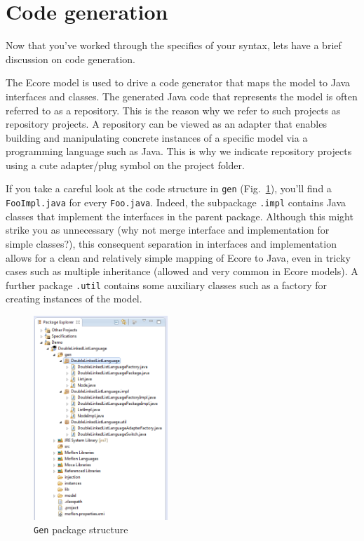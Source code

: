 \newpage
\genHeader
\hypertarget{codeGen common}{} 
\section{Code generation}

Now that you've worked through the specifics of your syntax, lets have a brief discussion on code generation.

The Ecore model is used to drive a code generator that maps the model to Java interfaces and classes. The generated Java code that represents the model is often
referred to as a repository. This is the reason why we refer to such projects as repository projects. A repository can be viewed as an adapter that enables
building and manipulating concrete instances of a specific model via a programming language such as Java. This is why we indicate repository projects using a
cute adapter/plug symbol on the project folder.

If you take a careful look at the code structure in \texttt{gen} (Fig.~\ref{eclipse:structureGen}), you'll find a \texttt{FooImpl.java} for every
\texttt{Foo.java}. Indeed, the subpackage \texttt{.impl} contains Java classes that implement the interfaces in the parent package. Although this might strike
you as unnecessary (why not merge interface and implementation for simple classes?), this consequent separation in interfaces and implementation allows for a
clean and relatively simple mapping of Ecore to Java, even in tricky cases such as multiple inheritance (allowed and very common in Ecore models). A further
package \texttt{.util} contains some auxiliary classes such as a factory for creating instances of the model.

 \begin{figure}[htbp]
  \centering
  \includegraphics[width=0.45\textwidth]{eclipse_structureGen}
  \caption{\texttt{Gen} package structure}
  \label{eclipse:structureGen}
\end{figure}

